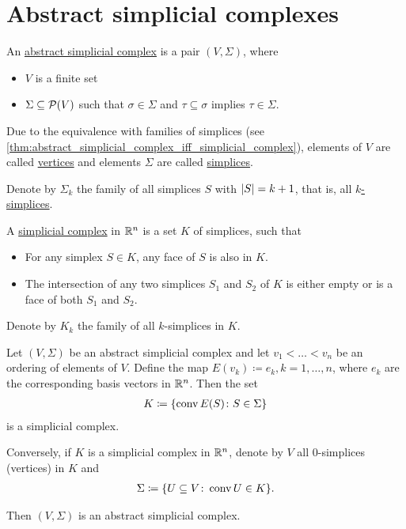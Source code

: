 \section{Abstract simplicial complexes}\label{sec:abstract_simplicial_complexes}

\begin{definition}\label{def:abstract_simplicial_complex}\cite[definition 2.1]{Carlsson2009}
  An \ul{abstract simplicial complex} is a pair $(V, \Sigma)$, where
  \begin{itemize}
    \item $V$ is a finite set
    \item $\Sigma \subseteq \operatorname{\mathcal P}(V)$ such that $\sigma \in \Sigma$ and $\tau \subseteq \sigma$ implies $\tau \in \Sigma$.
  \end{itemize}

  Due to the equivalence with families of simplices (see \cref{thm:abstract_simplicial_complex_iff_simplicial_complex}), elements of $V$ are called \ul{vertices} and elements $\Sigma$ are called \ul{simplices}.

  Denote by $\Sigma_k$ the family of all simplices $S$ with $\left\vert S \right\vert = k + 1$, that is, all \ul{$k$-simplices}.
\end{definition}

\begin{definition}\label{def:simplicial_complex}
  A \ul{simplicial complex} in $\mathbb R^n$ is a set $K$ of simplices, such that
  \begin{itemize}
    \item For any simplex $S \in K$, any face of $S$ is also in $K$.
    \item The intersection of any two simplices $S_1$ and $S_2$ of $K$ is either empty or is a face of both $S_1$ and $S_2$.
  \end{itemize}

  Denote by $K_k$ the family of all $k$-simplices in $K$.
\end{definition}

\begin{proposition}\label{thm:abstract_simplicial_complex_iff_simplicial_complex}
  Let $(V, \Sigma)$ be an abstract simplicial complex and let $v_1 < \ldots < v_n$ be an ordering of elements of $V$. Define the map $E(v_k) \coloneqq e_k, k = 1, \ldots, n$, where $e_k$ are the corresponding basis vectors in $\mathbb R^n$. Then the set
  \begin{align*}
    K \coloneqq \{ \operatorname{conv} E(S) \colon S \in \Sigma \}
  \end{align*}
  is a simplicial complex.

  Conversely, if $K$ is a simplicial complex in $\mathbb R^n$, denote by $V$ all $0$-simplices (vertices) in $K$ and
  \begin{align*}
    \Sigma \coloneqq \{ U \subseteq V \colon \operatorname{conv} U \in K \}.
  \end{align*}

  Then $(V, \Sigma)$ is an abstract simplicial complex.
\end{proposition}

